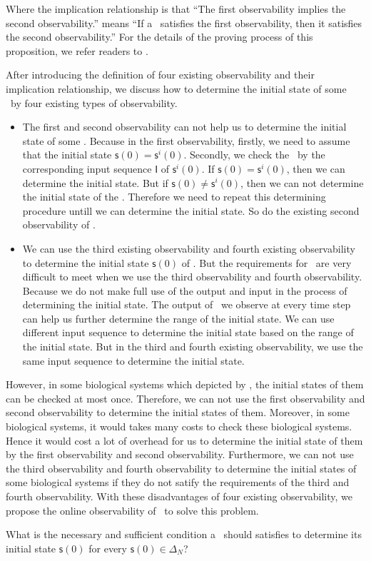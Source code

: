 Where the implication relationship is that ``The first observability implies the second observability.'' means ``If a \BCN\ satisfies the first observability, then it satisfies the second observability.'' For the details of the proving process of this proposition, we refer readers to \cite{Zhang2016Observability}.
   
After introducing the definition of four existing observability and their implication relationship, we discuss how to determine the initial state of some \BCNs\ by four existing types of observability. 
\begin{itemize}
\item The first and second observability can not help us to determine the initial state of some \BCNs. Because in the first observability, firstly, we need to assume that the initial state $\mathsf{s}(0)=\mathsf{s}^{i}(0)$. Secondly, we check the \BCN\ by the corresponding input sequence $\mathsf{I}$ of $\mathsf{s}^{i}(0)$. If $\mathsf{s}(0)=\mathsf{s}^{i}(0)$, then we can determine the initial state. But if $\mathsf{s}(0)\ne \mathsf{s}^{i}(0)$, then we can not determine the initial state of the \BCN. Therefore we need to repeat this determining procedure untill we can determine the initial state. %
So do the existing second observability of \BCNs.
\item We can use the third existing observability and fourth existing observability to determine the initial state $\mathsf{s}(0)$ of \BCNs. But the requirements for \BCNs\ are very difficult to meet when we use the third observability and fourth observability. Because we do not make full use of the output and input in the process of determining the initial state. The output of \BCNs\ we observe at every time step can help us further determine the range of the initial state. We can use different input sequence to determine the initial state based on the range of the initial state. But in the third and fourth existing observability, we use the same input sequence to determine the initial state.
\end{itemize} 
 
However, in some biological systems which depicted by \BCNs, the initial states of them can be checked at most once. Therefore, we can not use the first observability and second observability to determine the initial states of them. Moreover, in some biological systems, it would takes many costs to check these biological systems. Hence it would cost a lot of overhead for us to determine the initial state of them by the first observability and second observability. Furthermore, we can not use the third observability and fourth observability to determine the initial states of some biological systems if they do not satify the requirements of the third and fourth observability. With these disadvantages of four existing observability, we propose the online observability of \BCNs\ to solve this problem.

 \begin{problem}
\label{pro:2}
What is the necessary and sufficient condition a \BCN\ should satisfies to determine its initial state $\mathsf{s}(0)$ for every $\mathsf{s}(0)\in\Delta_N$?
\end{problem}